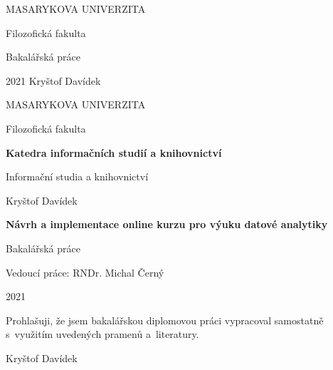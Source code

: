 \documentclass[a4paper,12pt,openany,twoside]{book} %
\begin{document}
	\clearpage


		\begin{center}
			{\Large\uppercase{Masarykova univerzita}}

			\vspace{2em}

			{\Large Filozofická fakulta}

			\vspace{20em}

			{\LARGE Bakalářská práce}

			\vfill
			    {\LARGE 2021}
			    \hfill
            	{\LARGE Kryštof Davídek}
		\end{center}

		\begin{center}
			{\Large\uppercase{Masarykova univerzita}}

			\vspace{2em}

			{\Large Filozofická fakulta}

			\vspace{5em}

			{\Large\bf Katedra informačních studií a knihovnictví}

			\vspace{2em}

			{\Large Informační studia a knihovnictví}

			\vspace{11em}

			{\large Kryštof Davídek }
			
			\vspace{3em}
			
			{\LARGE\bf Návrh a implementace online kurzu pro výuku datové analytiky}

			\vspace{1.5em}

			{\Large Bakalářská práce}

			\vfill
			\vspace{3em}
			{\large Vedoucí práce: RNDr. Michal Černý}
			\vspace{1em}
			
			{\large 2021}
		\end{center}
		
\newpage

\par
\par\vspace*{\fill}
	\pagestyle{plain}
\begin{flushright}
	Prohlašuji, že jsem bakalářskou diplomovou práci vypracoval samostatně s~využitím uvedených pramenů a~literatury.

	\vspace{3em}

	    \makebox[2.5in][r]{\dotfill}
	    
	    Kryštof Davídek

	    \par

\end{flushright}
\clearpage
\end{document}
